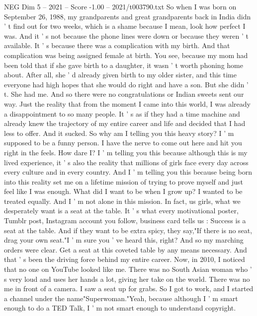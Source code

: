 \begin{textsample}{NEG Dim 5 – 2021 – Score -1.00 – 2021/t003790.txt}  \label{ex:f5_neg_008}
So when I was born on September 26, 1988, my grandparents and great grandparents back in India didn ' t find out for two weeks, which is a shame because I mean, look how perfect I was.
And it ' s not because the phone lines were down or because they weren ' t available.
It ' s because there was a complication with my birth.
And that complication was being assigned female at birth.
You see, because my mom had been told that if she gave birth to a daughter, it wasn ' t worth phoning home about.
After all, she ' d already given birth to my older sister, and this time everyone had high hopes that she would do right and have a son.
But she didn ' t.
She had me.
And so there were no congratulations or Indian sweets sent our way.
Just the reality that from the moment I came into this world, I was already a disappointment to so many people.
It ' s as if they had a time machine and already knew the trajectory of my entire career and life and decided that I had less to offer.
And it sucked.
So why am I telling you this heavy story?
I ' m supposed to be a funny person.
I have the nerve to come out here and hit you right in the feels.
How dare I?
I ' m telling you this because although this is my lived experience, it ' s also the reality that millions of girls face every day across every culture and in every country.
And I ' m telling you this because being born into this reality set me on a lifetime mission of trying to prove myself and just feel like I was enough.
What did I want to be when I grow up?
I wanted to be treated equally.
And I ' m not alone in this mission.
In fact, us girls, what we desperately want is a seat at the table.
It ' s what every motivational poster, Tumblr post, Instagram account you follow, business card tells us : Success is a seat at the table.
And if they want to be extra spicy, they say,"If there is no seat, drag your own seat."I ' m sure you ' ve heard this, right?
And so my marching orders were clear.
Get a seat at this coveted table by any means necessary.
And that ' s been the driving force behind my entire career.
Now, in 2010, I noticed that no one on YouTube looked like me.
There was no South Asian woman who ' s very loud and uses her hands a lot, giving her take on the world.
There was no me in front of a camera.
I saw a seat up for grabs.
So I got to work, and I started a channel under the name"Superwoman."Yeah, because although I ' m smart enough to do a TED Talk, I ' m not smart enough to understand copyright.

\end{textsample}

